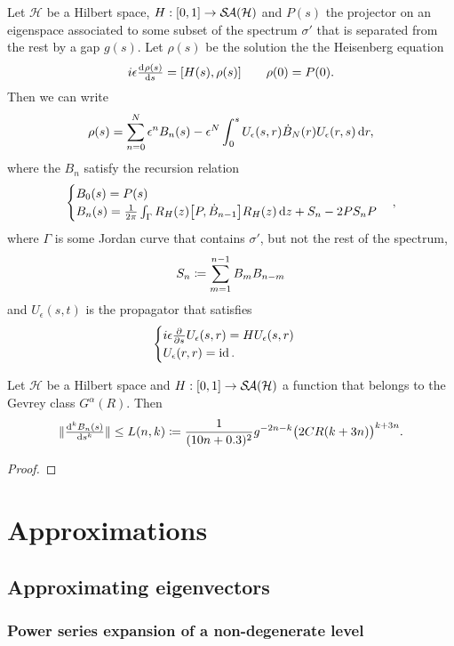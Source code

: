 \begin{proposition}
Let $\mathcal{H}$ be a Hilbert space, $H: \interval{0,1}\to \SelfAdjoints(\mathcal{H})$ and $P(s)$ the projector on an eigenspace associated to some subset of the spectrum $\sigma'$ that is separated from the rest by a gap $g(s)$. Let $\rho(s)$ be the solution the the Heisenberg equation
\[ i\epsilon \od{\rho(s)}{s} = [H(s), \rho(s)] \qquad \rho(0)= P(0). \]
Then we can write
\[ \rho(s) = \sum_{n=0}^N \epsilon^nB_n(s) - \epsilon^N\int_0^s U_\epsilon(s,r)\dot{B}_N(r)U_\epsilon(r,s) \operatorname{d \!}{r}, \]
where the $B_n$ satisfy the recursion relation
\[ \begin{cases}
B_0(s) = P(s) \\
B_n(s) = \frac{1}{2\pi}\int_\Gamma R_H(z)\big[P, \dot{B}_{n-1}\big]R_H(z) \operatorname{d \!}{z} + S_n - 2PS_nP
\end{cases}, \]
where $\Gamma$ is some Jordan curve that contains $\sigma'$, but not the rest of the spectrum,
\[ S_n \coloneqq \sum_{m=1}^{n-1}B_mB_{n-m} \]
and $U_\epsilon(s,t)$ is the propagator that satisfies
\[ \begin{cases}
i\epsilon  \frac{\partial{^{}}}{\partial{{s}^{}}} U_\epsilon(s,r) = HU_\epsilon(s,r) \\
U_\epsilon(r,r) = \operatorname{id}.
\end{cases} \]
\end{proposition}

\begin{lemma}
Let $\mathcal{H}$ be a Hilbert space and $H: \interval{0,1}\to \SelfAdjoints(\mathcal{H})$ a function that belongs to the Gevrey class $G^\alpha(R)$. Then
\[ \norm{\od[k]{B_n(s)}{s}} \leq L(n,k) \defeq \frac{1}{(10n + 0.3)^2}g^{-2n-k}\big(2CR(k+3n)\big)^{k+3n}. \]
\end{lemma}
\begin{proof}

\end{proof}

\chapter{Approximations}
\section{Approximating eigenvectors}
\subsection{Power series expansion of a non-degenerate level}

